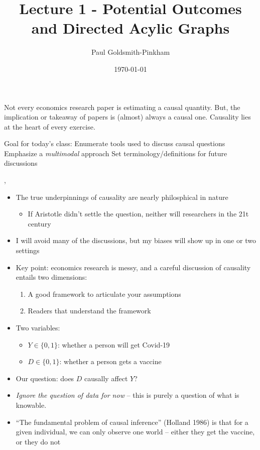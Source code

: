 \documentclass{tufte-handout}
\title{Lecture 1 - Potential Outcomes and Directed Acylic Graphs}
\author{Paul Goldsmith-Pinkham}
\date{\today}
\begin{document}
\maketitle



Not every economics research paper is estimating a causal quantity. But, the implication or takeaway of papers is (almost) always a causal one.  Causality lies at the heart of every exercise. 



 Goal for today's class:
  Enumerate tools used to discuss causal questions
Emphasize a \emph{multimodal} approach
Set terminology/definitions for future discussions

    ,
\cite{lewbel2019identification}

\begin{itemize}
  \item The true underpinnings of causality are nearly philosphical in nature
    \begin{itemize}
    \item If Aristotle didn't settle the question, neither will
      researchers in the 21t century
    \end{itemize}
  \item I will avoid many of the discussions, but my biases will show up in one or two settings
  \item Key point: economics research is messy, and a careful
    discussion of causality entails two dimensions:
    \begin{enumerate}
    \item A good framework to articulate your assumptions
    \item Readers that understand the framework
    \end{enumerate}
  \end{itemize}


  \begin{itemize}
    \item  Two variables:
    \begin{itemize}
    \item $Y \in \{0, 1\}$: whether a person will get Covid-19
    \item $D \in \{0, 1\}$: whether a person gets a vaccine
    \end{itemize}
  \item Our question: does $D$ causally affect $Y$?
  \item \emph{Ignore the question of data for now} -- this is purely a
    question of what is knowable.
  \item ``The fundamental problem of causal inference'' (Holland 1986)
    is that for a given individual, we can only observe one world --
    either they get the vaccine, or they do not
  \end{itemize}


\end{document}
